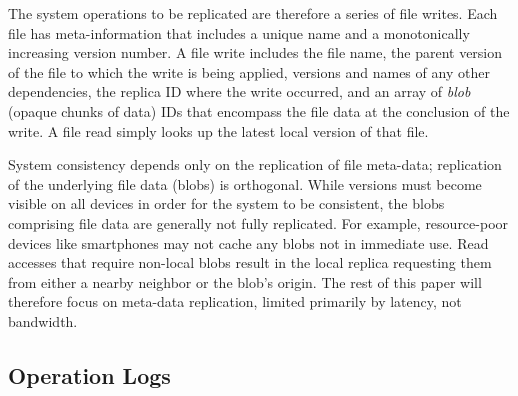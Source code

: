\documentclass[10pt,conference,letterpaper]{IEEEtran}
\newcommand{\todo}[1]{{\textcolor{red}{#1}}}
\newcommand{\pjk}[1]{[\todo{PJK: #1}]}
\begin{document}
The system operations to be replicated are therefore a series of file writes.
Each file has meta-information that includes a unique name and a monotonically
increasing version number.
A file write includes the file name, the parent version of the file to which the write is being applied,
versions and names of any other dependencies, the replica ID where the write
occurred, and an array of \emph{blob} (opaque chunks of data) IDs that encompass the file data at
the conclusion of the write.
A file read simply looks up the latest local version of that file.


System consistency depends only on the replication of file meta-data; replication of
the underlying file data (blobs) is orthogonal.
While versions must become visible on all devices in order for the system to be
consistent, the blobs comprising file data are generally not fully replicated.
For example, resource-poor devices like smartphones may not cache any blobs not in
immediate use.
Read accesses that require non-local blobs result in the local replica requesting them
from either a nearby neighbor or the blob's origin.
The rest of this paper will therefore focus on meta-data replication, limited primarily
by latency, not bandwidth.

\subsection{Operation Logs}
\end{document}
